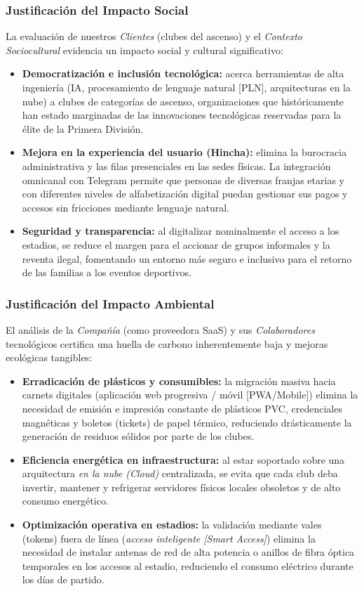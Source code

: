 \subsubsection*{Justificación del Impacto Social}
La evaluación de nuestros \textit{Clientes} (clubes del ascenso) y el \textit{Contexto Sociocultural} evidencia un impacto social y cultural significativo:
\begin{itemize}
    \item \textbf{Democratización e inclusión tecnológica:} acerca herramientas de alta ingeniería (IA, procesamiento de lenguaje natural [PLN], arquitecturas en la nube) a clubes de categorías de ascenso, organizaciones que históricamente han estado marginadas de las innovaciones tecnológicas reservadas para la élite de la Primera División.
    \item \textbf{Mejora en la experiencia del usuario (Hincha):} elimina la burocracia administrativa y las filas presenciales en las sedes físicas. La integración omnicanal con Telegram permite que personas de diversas franjas etarias y con diferentes niveles de alfabetización digital puedan gestionar sus pagos y accesos sin fricciones mediante lenguaje natural.
    \item \textbf{Seguridad y transparencia:} al digitalizar nominalmente el acceso a los estadios, se reduce el margen para el accionar de grupos informales y la reventa ilegal, fomentando un entorno más seguro e inclusivo para el retorno de las familias a los eventos deportivos.
\end{itemize}

\subsubsection*{Justificación del Impacto Ambiental}
El análisis de la \textit{Compañía} (como proveedora SaaS) y sus \textit{Colaboradores} tecnológicos certifica una huella de carbono inherentemente baja y mejoras ecológicas tangibles:
\begin{itemize}
    \item \textbf{Erradicación de plásticos y consumibles:} la migración masiva hacia carnets digitales (aplicación web progresiva / móvil [PWA/Mobile]) elimina la necesidad de emisión e impresión constante de plásticos PVC, credenciales magnéticas y boletos (tickets) de papel térmico, reduciendo drásticamente la generación de residuos sólidos por parte de los clubes.
    \item \textbf{Eficiencia energética en infraestructura:} al estar soportado sobre una arquitectura \textit{en la nube (Cloud)} centralizada, se evita que cada club deba invertir, mantener y refrigerar servidores físicos locales obsoletos y de alto consumo energético.
    \item \textbf{Optimización operativa en estadios:} la validación mediante vales (tokens) fuera de línea (\textit{acceso inteligente [Smart Access]}) elimina la necesidad de instalar antenas de red de alta potencia o anillos de fibra óptica temporales en los accesos al estadio, reduciendo el consumo eléctrico durante los días de partido.
\end{itemize}

